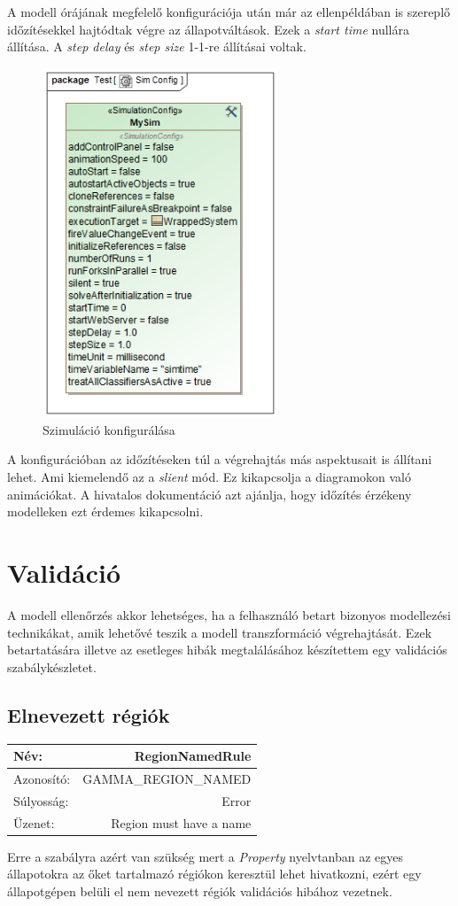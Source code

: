 A modell órájának megfelelő konfigurációja után már az ellenpéldában is szereplő időzítésekkel hajtódtak végre az állapotváltások. Ezek a \emph{start time} nullára állítása. A \emph{step delay} és \emph{step size} 1-1-re állításai voltak.
\begin{figure}[!ht]
	\centering
	\includegraphics[width=70mm, keepaspectratio]{figures/contribution/Sim Config.png}
	\caption{Szimuláció konfigurálása}
	\label{fig:simconf}
\end{figure}
A konfigurációban az időzítéseken túl a végrehajtás más aspektusait is állítani lehet. Ami kiemelendő az a \emph{slient} mód. Ez kikapcsolja a diagramokon való animációkat. A  hivatalos dokumentáció azt ajánlja, hogy időzítés érzékeny modelleken ezt érdemes kikapcsolni. %

\newpage
\section{Validáció}

A modell ellenőrzés akkor lehetséges, ha a felhasználó betart bizonyos modellezési technikákat, amik lehetővé teszik a modell transzformáció végrehajtását. Ezek betartatására illetve az esetleges hibák megtalálásához készítettem egy validációs szabálykészletet.


\subsection{Elnevezett régiók}

\begin{tabular}{ | l | r | }
	\hline
	Név: & RegionNamedRule  \\ 
	\hline
	Azonosító: & GAMMA\_REGION\_NAMED \\
	\hline
	Súlyosság: & Error \\  
	\hline
	Üzenet: & Region must have a name \\
	\hline
\end{tabular}\newline
\newline
Erre a szabályra azért van szükség mert a \emph{Property} nyelvtanban az egyes állapotokra az őket tartalmazó régiókon keresztül lehet hivatkozni, ezért egy állapotgépen belüli el nem nevezett régiók validációs hibához vezetnek.

